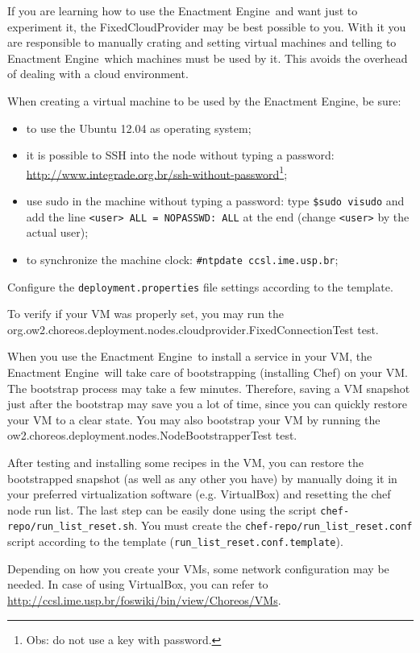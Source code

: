 \documentclass[a4paper, 10pt]{article}
\newcommand{\ee}{Enactment Engine}
\begin{document}
If you are learning how to use the \ee\ and want just to experiment it, the \textsf{FixedCloudProvider} may be best possible to you. With it you are responsible to manually crating and setting virtual machines and telling to \ee\ which machines must be used by it. This avoids the overhead of dealing with a cloud environment. 

When creating a virtual machine to be used by the \ee, be sure:
\begin{itemize}
\item to use the Ubuntu 12.04 as operating system;
\item it is possible to SSH into the node without typing a password: \url{http://www.integrade.org.br/ssh-without-password}\footnote{Obs: do not use a key with password.};
\item use sudo in the machine without typing a password: type \texttt{\$sudo visudo} and add the line \texttt{<user> ALL = NOPASSWD: ALL} at the end (change \texttt{<user>} by the actual user);
\item to synchronize the machine clock: \texttt{\#ntpdate ccsl.ime.usp.br};
\end{itemize}

Configure the \texttt{deployment.properties} file settings according to the template.

To verify if your VM was properly set, you may run the \\ \textsf{org.ow2.choreos.deployment.nodes.cloudprovider.FixedConnectionTest} test.

When you use the \ee\ to install a service in your VM, the \ee\ will take care of bootstrapping (installing Chef) on your VM. The bootstrap process may take a few minutes. Therefore, saving a VM snapshot just after the bootstrap may save you a lot of time, since you can quickly restore your VM to a clear state. You may also bootstrap your VM by running the \textsf{ow2.choreos.deployment.nodes.NodeBootstrapperTest} test.

After testing and installing some recipes in the VM, you can restore the bootstrapped snapshot (as well as any other you have) by manually doing it in your preferred virtualization software (e.g. VirtualBox) and resetting the chef node run list. The last step can be easily done using the script \texttt{chef-repo/run\_list\_reset.sh}. You must create the \texttt{chef-repo/run\_list\_reset.conf} script according to the template (\texttt{run\_list\_reset.conf.template}).

Depending on how you create your VMs, some network configuration may be needed. In case of using VirtualBox, you can refer to \url{http://ccsl.ime.usp.br/foswiki/bin/view/Choreos/VMs}.
\end{document}
